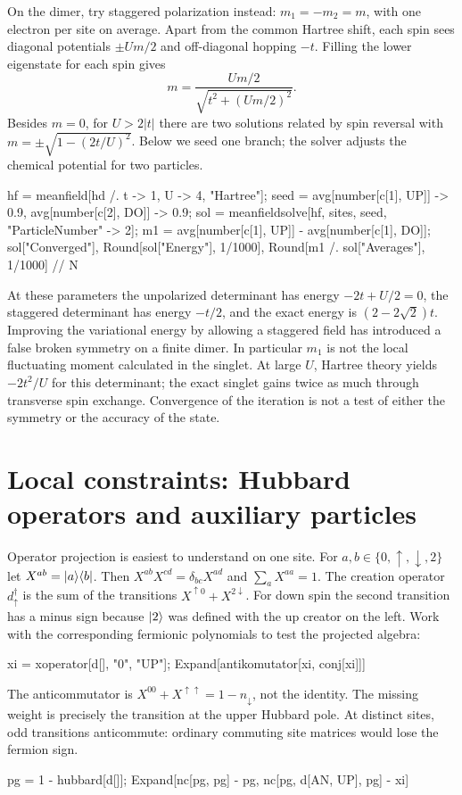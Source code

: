 On the dimer, try staggered polarization instead:
$m_1=-m_2=m$, with one electron per site on average. Apart from the
common Hartree shift, each spin sees diagonal potentials $\pm Um/2$
and off-diagonal hopping $-t$. Filling the lower eigenstate for each
spin gives
\[
 m=\frac{Um/2}{\sqrt{t^2+(Um/2)^2}} .
\]
Besides $m=0$, for $U>2|t|$ there are two solutions related by spin
reversal with $m=\pm\sqrt{1-(2t/U)^2}$. Below we seed one branch;
the solver adjusts the chemical potential for two particles.
\begin{wl}
hf = meanfield[hd /. {t -> 1, U -> 4}, "Hartree"];
seed = {avg[number[c[1], UP]] -> 0.9, avg[number[c[2], DO]] -> 0.9};
sol = meanfieldsolve[hf, sites, seed, "ParticleNumber" -> 2];
m1 = avg[number[c[1], UP]] - avg[number[c[1], DO]];
{sol["Converged"], Round[sol["Energy"], 1/1000],
  Round[m1 /. sol["Averages"], 1/1000] // N}
\end{wl}
At these parameters the unpolarized determinant has energy
$-2t+U/2=0$, the staggered determinant has energy $-t/2$, and the
exact energy is $(2-2\sqrt{2})t$. Improving the variational energy by
allowing a staggered field has introduced a false broken symmetry on a
finite dimer. In particular $m_1$ is not the local fluctuating moment
calculated in the singlet. At large $U$, Hartree theory yields
$-2t^2/U$ for this determinant; the exact singlet gains twice as much
through transverse spin exchange. Convergence of the iteration is not
a test of either the symmetry or the accuracy of the state.

\section{Local constraints: Hubbard operators and auxiliary particles}
Operator projection is easiest to understand on one site. For
$a,b\in\{0,\uparrow,\downarrow,2\}$ let $X^{ab}=\lvert a\rangle\langle b\rvert$.
Then $X^{ab}X^{cd}=\delta_{bc}X^{ad}$ and $\sum_a X^{aa}=1$.
The creation operator $d^\dagger_\uparrow$ is the sum of the transitions
$X^{\uparrow0}+X^{2\downarrow}$. For down spin the second transition
has a minus sign because $\lvert 2\rangle$ was defined with the up creator
on the left. Work with the corresponding fermionic polynomials to
test the projected algebra:
\begin{wl}
xi = xoperator[d[], "0", "UP"];
Expand[antikomutator[xi, conj[xi]]]
\end{wl}
The anticommutator is $X^{00}+X^{\uparrow\uparrow}
=1-n_\downarrow$, not the identity. The missing weight is precisely
the transition at the upper Hubbard pole. At distinct sites, odd
transitions anticommute: ordinary commuting site matrices would lose
the fermion sign.
\begin{wl}
pg = 1 - hubbard[d[]];
Expand[{nc[pg, pg] - pg, nc[pg, d[AN, UP], pg] - xi}]
\end{wl}

